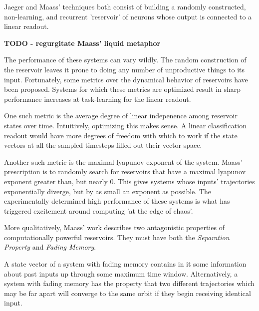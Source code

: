 \documentclass{elsart}
\begin{document}
Jaeger and Maass' techniques both consist of building a randomly constructed,
non-learning, and recurrent
'reservoir' of neurons whose output is connected to a linear readout.

\textbf{TODO - regurgitate Maass' liquid metaphor}


The performance of these systems can vary wildly.  The random construction of
the reservoir leaves it prone to doing any number of unproductive things
to its input.  Fortunately, some metrics over the dynamical behavior of
reservoirs have been proposed.  Systems for which these metrics are optimized
result in sharp performance increases at task-learning for the linear readout.

One such metric is the average degree of linear 
indepenence among reservoir
states over time.  Intuitively, optimizing this makes sense.  
A linear classification
readout would have more degrees of freedom with which to work if the
state vectors at all the sampled timesteps filled out their vector space.


Another such metric is the maximal lyapunov exponent of the system.  
Maass' prescription
is to randomly search for reservoirs that have a maximal lyapunov exponent
greater than, but nearly 0.  This gives systems whose inputs' trajectories
exponentially diverge, but by as small an exponent as possible.  The 
experimentally determined high performance of these systems is what has
triggered excitement around computing 'at the edge of chaos'.

More qualitatively, Maass' work describes two antagonistic properties of 
computationally powerful reservoirs.  They must have both the \textit{
    Separation Property} and \textit{Fading Memory}.

    A state vector of a system with fading memory contains in it some
    information about past inputs up through some maximum time window.
    Alternatively, a system with fading memory has the property that 
    two different trajectories which may be far apart will converge to
    the same orbit if they begin receiving identical input.
\end{document}
